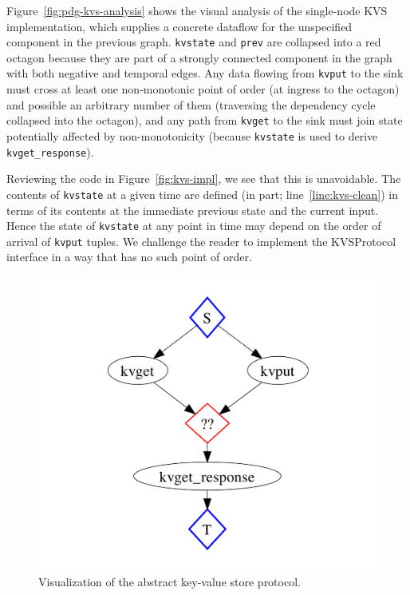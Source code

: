 Figure~\ref{fig:pdg-kvs-analysis} shows the visual analysis of the single-node
KVS implementation, which supplies a concrete dataflow for the unspecified
component in the previous graph.  \texttt{kvstate} and \texttt{prev} are
collapsed into a red octagon because they are part of a strongly connected
component in the graph with both negative and temporal edges.  Any data flowing
from \texttt{kvput} to the sink must cross at least one non-monotonic point of
order (at ingress to the octagon) and possible an arbitrary number of them
(traversing the dependency cycle collapsed into the octagon), and any path from \texttt{kvget} to the sink must join
state potentially affected by non-monotonicity (because \texttt{kvstate} is used
to derive \texttt{kvget\_response}).

Reviewing the code in Figure~\ref{fig:kvs-impl}, we see that this is
unavoidable.  The contents of \texttt{kvstate} at a given time are defined (in
part; line~\ref{line:kvs-clean}) in terms of its contents at the immediate
previous state and the current input.  Hence the state of \texttt{kvstate} at
any point in time may depend on the order of arrival of \texttt{kvput} tuples.
We challenge the reader to implement the KVSProtocol interface in a way that
has no such point of order.



\begin{figure}[t]
\centering
\includegraphics[width=0.8\linewidth]{fig/kvs_proto_pdg.pdf}
\vspace{-10pt}
\caption{Visualization of the abstract key-value store protocol.}
\label{fig:pdg-kvs-proto-analysis}
\vspace{-2pt}
\end{figure}

